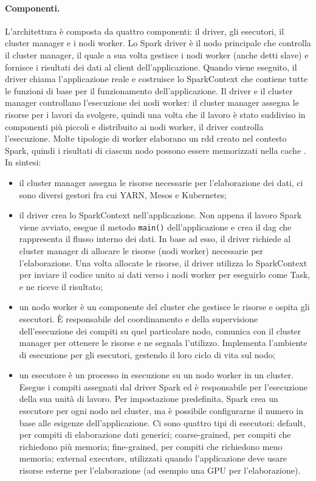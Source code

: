 \documentclass[12pt,a4paper,fleqn,titlepage]{report}
\begin{document}
        \paragraph{Componenti.}
        L'architettura è composta da quattro componenti: il driver, gli esecutori, il cluster manager e i nodi worker. Lo Spark driver è il nodo principale che controlla il cluster manager, il quale a sua volta gestisce i nodi worker (anche detti slave) e fornisce i risultati dei dati al client dell'applicazione. Quando viene eseguito, il driver chiama l'applicazione reale e costruisce lo SparkContext che contiene tutte le funzioni di base per il funzionamento dell'applicazione. Il driver e il cluster manager controllano l'esecuzione dei nodi worker: il cluster manager assegna le risorse per i lavori da svolgere, quindi una volta che il lavoro è stato suddiviso in componenti più piccoli e distribuito ai nodi worker, il driver controlla l'esecuzione. Molte tipologie di worker elaborano un \gls{rdd} creato nel contesto Spark, quindi i risultati di ciascun nodo possono essere memorizzati nella cache \cite{perrin:2020}.
        In sintesi:
        \begin{itemize}
            \item il cluster manager assegna le risorse necessarie per l'elaborazione dei dati, ci sono diversi gestori fra cui YARN, Mesos e Kubernetes;
            \item il driver crea lo SparkContext nell'applicazione. Non appena il lavoro Spark viene avviato, esegue il metodo \lstinline{main()} dell'applicazione e crea il \gls{dag} che rappresenta il flusso interno dei dati. In base ad esso, il driver richiede al cluster manager di allocare le risorse (nodi worker) necessarie per l'elaborazione. Una volta allocate le risorse, il driver utilizza lo SparkContext per inviare il codice unito ai dati verso i nodi worker per eseguirlo come Task, e ne riceve il risultato;
            \item un nodo worker è un componente del cluster che gestisce le risorse e ospita gli esecutori. È responsabile del coordinamento e della supervisione dell'esecuzione dei compiti su quel particolare nodo, comunica con il cluster manager per ottenere le risorse e ne segnala l'utilizzo. Implementa l'ambiente di esecuzione per gli esecutori, gestendo il loro ciclo di vita sul nodo;
            \item un esecutore è un processo in esecuzione su un nodo worker in un cluster. Esegue i compiti assegnati dal driver Spark ed è responsabile per l'esecuzione della sua unità di lavoro. Per impostazione predefinita, Spark crea un esecutore per ogni nodo nel cluster, ma è possibile configurarne il numero in base alle esigenze dell'applicazione.
            Ci sono quattro tipi di esecutori: default, per compiti di elaborazione dati generici; coarse-grained, per compiti che richiedono più memoria; fine-grained, per compiti che richiedono meno memoria; external executors, utilizzati quando l'applicazione deve usare risorse esterne per l'elaborazione (ad esempio una GPU per l'elaborazione).
        \end{itemize}
\end{document}
